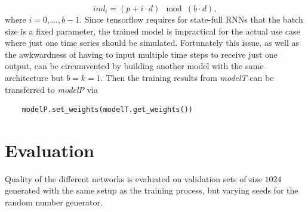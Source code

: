 \documentclass[sigconf]{acmart}
\begin{document}
\[
ind_i = (p + i \cdot d) \mod (b \cdot d),
\]
where $i=0,\dots,b-1$.
Since tensorflow requires for state-full RNNs that the batch size is a fixed parameter, the trained model is impractical for the actual use case where just one time series should be simulated. Fortunately this issue, as well as the awkwardness of having to input multiple time steps to receive just one output, can be circumvented by building another model with the same architecture but $b=k=1$. Then the training results from \textit{modelT} can be transferred to \textit{modelP} via 
\begin{verbatim}
	modelP.set_weights(modelT.get_weights())
\end{verbatim}
\section{Evaluation}
Quality of the different networks is evaluated on validation sets of size $1024$ generated with the same setup as the training process, but varying seeds for the random number generator.
\end{document}
